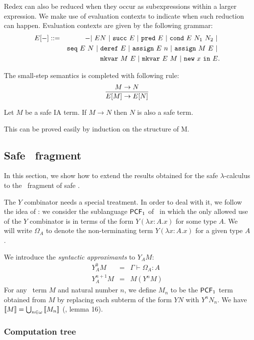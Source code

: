 Redex can also be reduced when they occur as subexpressions within a
larger expression. We make use of evaluation contexts to indicate
when such reduction can happen. Evaluation contexts are given by the
following grammar:
\begin{eqnarray*}
E[-] &::=& - |\ E N\ |\ \pcfsucc\ E\ |\ \pcfpred\ E\ |\ \pcfcond\ E\ N_1\ N_2\ |\ \\
&&    \iaseq\ E\ N\ |\ \iaderef\ E\ |\ \iaassign\ E\ n\ |\ \iaassign\ M\ E \ |\ \\
&&    \iamkvar\ M\ E\ |\ \iamkvar\ E\ M\ |\ \ianewin{x}\ E  .
\end{eqnarray*}

The small-step semantics is completed with following rule:
$$ \frac{\displaystyle M \rightarrow N}{E[M] \rightarrow E[N]} $$

\begin{lem}
\label{lem:ia_safety_preserved} Let $M$ be a safe IA term. If
$M \rightarrow N$ then $N$ is also a safe term.
\end{lem}
This can be proved easily by induction on the structure of M.


\subsection{Safe \pcf\ fragment}
In this section, we show how to extend the results obtained for the
safe $\lambda$-calculus to the \pcf\ fragment of safe \ialgol.

The $Y$ combinator needs a special treatment. In order to deal with
it, we follow the idea of \cite{abramsky:game-semantics-tutorial}:
we consider the sublanguage $\textsf{PCF}_1$ of \pcf\ in which the only
allowed use of the $Y$ combinator is in terms of the form $Y(
\lambda x:A .x )$ for some type $A$. We will write $\Omega_A$ to
denote the non-terminating term $Y(\lambda x:A .x)$ for a given type
$A$.

We introduce the \emph{syntactic approximants} to $Y_A M$:
\begin{eqnarray*}
Y^0_A M &=& \Gamma \vdash \Omega_A : A\\
Y^{n+1}_A M &=& M( Y^n M )
\end{eqnarray*}
For any \pcf\ term $M$ and natural number $n$, we define $M_n$ to be
the $\textsf{PCF}_1$ term obtained from $M$ by replacing each subterm of the
form $Y N$ with $Y^n N_n$. We have ${[\![ M ]\!]} = \bigcup_{n\in\omega}
{[\![ M_n ]\!]}$ (\cite{abramsky:game-semantics-tutorial}, lemma 16).


\subsubsection{Computation tree}

